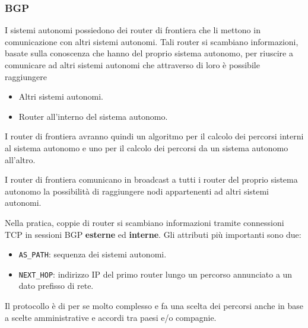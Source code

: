 \subsubsection{BGP}
I sistemi autonomi possiedono dei router di frontiera che li mettono
in comunicazione con altri sistemi autonomi.
Tali router si scambiano informazioni, basate sulla conoscenza che
hanno del proprio sistema autonomo, per riuscire a comunicare ad altri
sistemi autonomi che attraverso di loro è possibile raggiungere
\begin{itemize}
	\item Altri sistemi autonomi.
	\item Router all'interno del sistema autonomo.
\end{itemize}
I router di frontiera avranno quindi un algoritmo per il calcolo dei
percorsi interni al sistema autonomo e uno per il calcolo dei percorsi 
da un sistema autonomo all'altro.

I router di frontiera comunicano in broadcast a tutti i router del 
proprio sistema autonomo la possibilità di raggiungere nodi 
appartenenti ad altri sistemi autonomi.

Nella pratica, coppie di router si scambiano informazioni tramite
connessioni TCP in sessioni BGP \textbf{esterne} ed \textbf{interne}.
Gli attributi più importanti sono due:
\begin{itemize}
	\item \verb|AS_PATH|: sequenza dei sistemi autonomi.
	\item \verb|NEXT_HOP|: indirizzo IP del primo router lungo un
		percorso annunciato a un dato prefisso di rete.
\end{itemize}
Il protocollo è di per se molto complesso e fa una scelta dei percorsi
anche in base a scelte amministrative e accordi tra paesi e/o 
compagnie.
